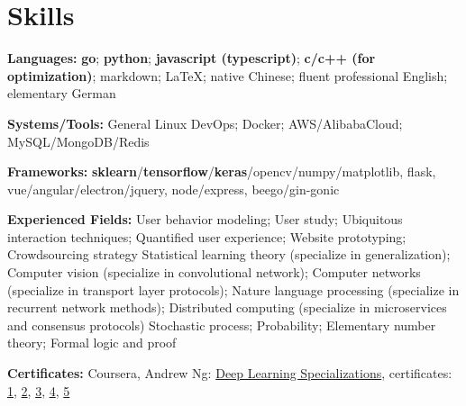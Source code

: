 \section{\textbf{Skills}}
\resumeSubHeadingListStart
\item{
  \textbf{Languages:}{ 
    \textbf{go}; \textbf{python}; 
    \textbf{javascript (typescript)}; 
    \textbf{c/c++ (for optimization)}; 
    markdown; \LaTeX; 
    native Chinese; fluent professional English; elementary German
  }
}
\item{
 \textbf{Systems/Tools:}{ General Linux DevOps; Docker; AWS/AlibabaCloud; MySQL/MongoDB/Redis}
}
\item{
 \textbf{Frameworks:}{ \textbf{sklearn}/\textbf{tensorflow}/\textbf{keras}/opencv/numpy/matplotlib, flask, vue/angular/electron/jquery, node/express, beego/gin-gonic}
}
\item{
  \textbf{Experienced Fields:}{ 
    \resumeItemListStart
        { 
          User behavior modeling;
          User study; 
          Ubiquitous interaction techniques; 
          Quantified user experience; 
          Website prototyping; 
          Crowdsourcing strategy
        }
        { 
          Statistical learning theory (specialize in generalization); 
          Computer vision (specialize in convolutional network); 
          Computer networks (specialize in transport layer protocols); 
          Nature language processing (specialize in recurrent network methods); 
          Distributed computing (specialize in microservices and consensus protocols)
        }
        { 
          Stochastic process; 
          Probability; 
          Elementary number theory; 
          Formal logic and proof
        }
   \resumeItemListEnd
  }
}
\item{
  \textbf{Certificates:}{
    Coursera, Andrew Ng: \href{https://www.coursera.org/account/accomplishments/specialization/QGH8ZVJ6J2L2}{Deep Learning Specializations}, certificates:
    \href{https://www.coursera.org/account/accomplishments/verify/YH4NT7HHN263}{1}, 
    \href{https://www.coursera.org/account/accomplishments/verify/QGH3GNGF6BM4}{2}, 
    \href{https://www.coursera.org/account/accomplishments/verify/6VU45R2SZEF6}{3},
    \href{https://www.coursera.org/account/accomplishments/verify/LF3K9BQQDLVL}{4},
    \href{https://www.coursera.org/account/accomplishments/verify/JQFLW2DPYAGW}{5}
  }
}
\resumeSubHeadingListEnd